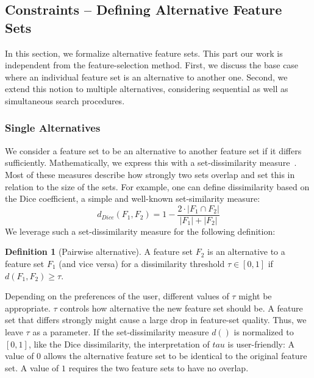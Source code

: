 \documentclass[conference]{IEEEtran}
\theoremstyle{definition}
\newtheorem{definition}{Definition}
\begin{document}
\subsection{Constraints -- Defining Alternative Feature Sets}
\label{sec:approach:constraints}

In this section, we formalize alternative feature sets.
This part our work is independent from the feature-selection method.
First, we discuss the base case where an individual feature set is an alternative to another one.
Second, we extend this notion to multiple alternatives, considering sequential as well as simultaneous search procedures.

\subsubsection{Single Alternatives}
\label{sec:approach:constraints:single}

We consider a feature set to be an alternative to another feature set if it differs sufficiently.
Mathematically, we express this with a set-dissimilarity measure~\cite{egghe2009new}.
Most of these measures describe how strongly two sets overlap and set this in relation to the size of the sets.
For example, one can define dissimilarity based on the Dice coefficient, a simple and well-known set-similarity measure:
%
\begin{equation}
	d_{Dice}(F_1,F_2) = 1 - \frac{2 \cdot |F_1 \cap F_2|}{|F_1| + |F_2|}
	\label{eq:dice}
\end{equation}
%
We leverage such a set-dissimilarity measure for the following definition:
%
\begin{definition}[Pairwise alternative]
	A feature set $F_2$ is an alternative to a feature set $F_1$ (and vice versa) for a dissimilarity threshold $\tau \in [0,1]$ if $d(F_1,F_2) \geq \tau$.
	\label{def:single-alternative}
\end{definition}
%
Depending on the preferences of the user, different values of $\tau$ might be appropriate.
$\tau$ controls how alternative the new feature set should be.
A feature set that differs strongly might cause a large drop in feature-set quality.
Thus, we leave $\tau$ as a parameter.
If the set-dissimilarity measure $d()$ is normalized to $[0,1]$, like the Dice dissimilarity, the interpretation of $tau$ is user-friendly:
A value of $0$ allows the alternative feature set to be identical to the original feature set.
A value of $1$ requires the two feature sets to have no overlap.
\end{document}
